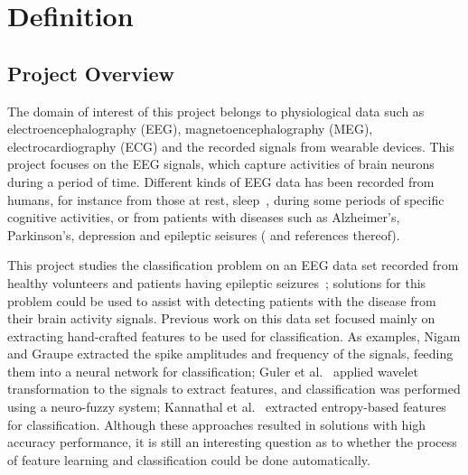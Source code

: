 \documentclass[12pt]{article}
\begin{document}
\maketitle

\section{Definition}

\subsection{Project Overview}
\noindent
The domain of interest of this project belongs to physiological data such as electroencephalography (EEG), magnetoencephalography (MEG), electrocardiography (ECG) and the recorded signals from wearable devices. This project focuses on the EEG signals, which capture activities of brain neurons during a period of time. Different kinds of EEG data has been recorded from humans, for instance from those at rest, sleep~\cite{langkvist2012sleep}, during some periods of specific cognitive activities, or from patients with diseases such as Alzheimer's, Parkinson's, depression and epileptic seisures (\cite{andrzejak2001indications} and references thereof).

This project studies the classification problem on an EEG data set recorded from healthy volunteers and patients having epileptic seizures~\cite{andrzejak2001indications}; solutions for this problem could be used to assist with detecting patients with the disease from their brain activity signals. Previous work on this data set focused mainly on extracting hand-crafted features to be used for classification. As examples, Nigam and Graupe \cite{nigam2004neural} extracted the spike amplitudes and frequency of the signals, feeding them into a neural network for classification; Guler et al.~\cite{guler2005recurrent} applied wavelet transformation to the signals to extract features, and classification was performed using a neuro-fuzzy system; Kannathal et al.~\cite{kannathal2005entropies} extracted entropy-based features for classification. Although these approaches resulted in solutions with high accuracy performance, it is still an interesting question as to whether the process of feature learning and classification could be done automatically.
\end{document}
